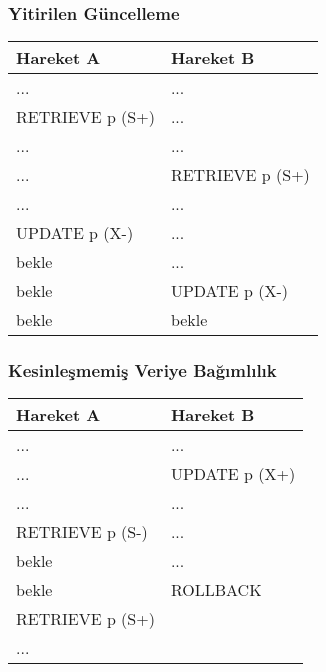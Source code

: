 \documentclass[dvipsnames]{beamer}
\theoremstyle{plain}
\begin{document}
\begin{frame}[fragile]
  \frametitle{Yitirilen Güncelleme}

    \begin{table}
      \begin{tabular}{ll}
Hareket A       & Hareket B      \\\hline
...             & ...            \\\pause
RETRIEVE p (S+) & ...            \\\pause
...             & ...            \\
...             & RETRIEVE p (S+)\\\pause
...             & ...            \\
UPDATE p (X-)   & ...            \\
bekle           & ...            \\\pause
bekle           & UPDATE p (X-)  \\
bekle           & bekle
      \end{tabular}
    \end{table}
\end{frame}

\begin{frame}[fragile]
  \frametitle{Kesinleşmemiş Veriye Bağımlılık}

    \begin{table}
      \begin{tabular}{ll}
Hareket A       & Hareket B    \\\hline
...             & ...          \\\pause
...             & UPDATE p (X+)\\\pause
...             & ...          \\
RETRIEVE p (S-) & ...          \\
bekle           & ...          \\\pause
bekle           & ROLLBACK     \\
RETRIEVE p (S+) &              \\
...             &
      \end{tabular}
    \end{table}
\end{frame}
\end{document}
